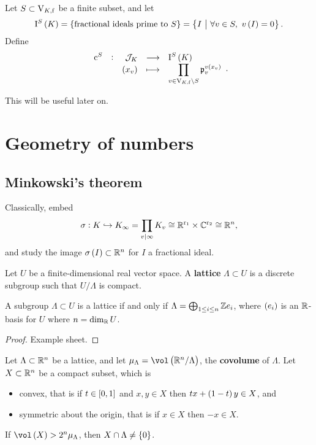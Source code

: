\begin{definition*}
Let $ S \subset \mathrm{V}_{K, \mathrm{f}} $ be a finite subset, and let
$$ \I^S\br{K} = \cbr{\text{fractional ideals prime to} \ S} = \cbr{I \st \forall v \in S, \ v\br{I} = 0}. $$
Define
$$ \function[\c^S]{\JJJ_K}{\I^S\br{K}}{\br{x_v}}{\prod_{v \in \V_{K, \f} \setminus S} \ppp_v^{v\br{x_v}}}. $$
\end{definition*}

This will be useful later on.

\pagebreak

\section{Geometry of numbers}

\subsection{Minkowski's theorem}

Classically, embed
$$ \sigma : K \hookrightarrow K_\infty = \prod_{v \mid \infty} K_v \cong \mathbb{R}^{\mathrm{r}_1} \times \mathbb{C}^{\mathrm{r}_2} \cong \mathbb{R}^n, $$
and study the image $ \sigma\br{I} \subset \RR^n $ for $ I $ a fractional ideal.

\begin{definition*}
Let $ U $ be a finite-dimensional real vector space. A \textbf{lattice} $ \Lambda \subset U $ is a discrete subgroup such that $ U / \Lambda $ is compact.
\end{definition*}

\begin{proposition}
A subgroup $ \Lambda \subset U $ is a lattice if and only if $ \Lambda = \bigoplus_{1 \le i \le n} \mathbb{Z} e_i $, where $ \br{e_i} $ is an $ \mathbb{R} $-basis for $ U $ where $ n = \dim_{\mathbb{R}} U $.
\end{proposition}

\begin{proof}
Example sheet.
\end{proof}

\begin{theorem}
\label{thm:6.2}
Let $ \Lambda \subset \mathbb{R}^n $ be a lattice, and let $ \mu_\Lambda = \vol\br{\RR^n / \Lambda} $, the \textbf{covolume} of $ \Lambda $. Let $ X \subset \mathbb{R}^n $ be a compact subset, which is
\begin{itemize}
\item convex, that is if $ t \in \sbr{0, 1} $ and $ x, y \in X $ then $ tx + \br{1 - t}y \in X $, and
\item symmetric about the origin, that is if $ x \in X $ then $ -x \in X $.
\end{itemize}
If $ \vol\br{X} > 2^n\mu_\Lambda $, then $ X \cap \Lambda \ne \cbr{0} $.
\end{theorem}

